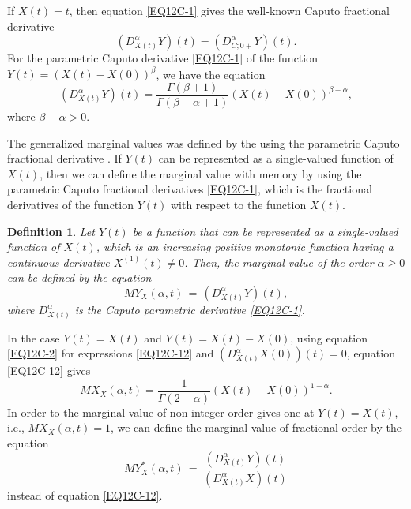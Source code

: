 \documentclass[12pt]{article}
\newtheorem{Definition}{Definition}
\begin{document}
If $X(t)=t$, then equation \eqref{EQ12C-1} gives the well-known Caputo fractional derivative 
\begin{equation}
\left(D^{\alpha}_{X(t)} Y \right)(t) =
\left(D^{\alpha}_{C;0+} Y\right) (t) .
\end{equation} 
For the parametric Caputo derivative \eqref{EQ12C-1} of the function $Y(t)=(X(t)-X(0))^{\beta}$, we have the equation
\begin{equation} \label{EQ12C-2} 
\left(D^{\alpha}_{X(t)} Y\right)(t) = 
\frac{\Gamma (\beta +1)}{\Gamma (\beta -\alpha +1)}
(X(t)-X(0))^{\beta -\alpha} , 
\end{equation} 
where $\beta -\alpha >0$.

The generalized marginal values was defined by the using the parametric Caputo fractional derivative \cite{BOOK-DG-2021}.
If $Y(t)$ can be represented as a single-valued function of $X(t)$, then we can define the marginal value with memory
by using the parametric Caputo fractional derivatives
\eqref{EQ12C-1}, which is the fractional derivatives of the function $Y(t)$ with respect to the function $X(t)$. 

\begin{Definition}
Let $Y(t)$ be a function that can be represented as a single-valued function of $X(t)$, which is an increasing positive monotonic function having a continuous derivative $X^{(1)}(t) \ne 0$. Then, the marginal value of the order $\alpha \ge 0$ can be defined by the equation
\begin{equation} \label{EQ12C-12}
MY_X(\alpha ,t) \, = \, 
\left(D^{\alpha}_{X(t)} Y\right)(t) , 
\end{equation} 
where $D^{\alpha}_{X(t)}$ is the Caputo parametric derivative \eqref{EQ12C-1}.
\end{Definition}

In the case $Y(t) = X(t)$ and $Y(t)=X(t)-X(0)$, using equation \eqref{EQ12C-2} for expressions \eqref{EQ12C-12} and $\left(D^{\alpha}_{X(t)} X(0)\right)(t)=0$, equation \eqref{EQ12C-12} gives
\begin{equation} \label{EQ12C-15-1} 
MX_X(\alpha ,t) = \frac{1}{\Gamma (2-\alpha)}
(X(t)-X(0))^{1-\alpha} . 
\end{equation} 
In order to the marginal value of non-integer order gives one at $Y(t)=X(t)$, i.e., $MX_X(\alpha,t)=1$, we can define the marginal value of fractional order by the equation
\begin{equation} \label{EQ12C-15-2} 
MY^{*}_X(\alpha ,t) \, = \, 
\frac{\left(D^{\alpha}_{X(t)} Y\right)(t)}{\left(D^{\alpha}_{X(t)} X \right)(t)} 
\end{equation} 
instead of equation \eqref{EQ12C-12}.
\end{document}
